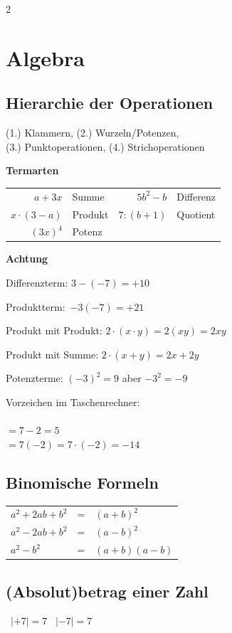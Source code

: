\begin{multicols}{2}
\section*{Algebra}
\subsection*{Hierarchie der Operationen}
(1.) Klammern, (2.) Wurzeln/Potenzen,\\
(3.) Punktoperationen, (4.) Strichoperationen

\textbf{Termarten}

\begin{tabular}{rlrl}
$a+3x$  &Summe  & $5b^2-b$ & Differenz\\
$x\cdot{}(3-a)$&Produkt& $7:(b+1)$& Quotient\\
$(3x)^4$&Potenz &          &
\end{tabular}

\textbf{Achtung}

Differenzterm:  $3-(-7) = +10$

Produktterm:\, $-3(-7) = +21$

Produkt mit Produkt: $2\cdot(x\cdot{}y) = 2(xy) = 2xy$

Produkt mit Summe: $2\cdot(x+y)=2x+2y$

Potenzterme: $(-3)^2 = 9$ aber $-3^2 = -9$


Vorzeichen im Taschenrechner:\\
\vspace{3mm}\\
$=7-2= 5$\\
$=7(-2)=7\cdot{}(-2)= -14$

\subsection*{Binomische Formeln}
\begin{tabular}{lcl}
  $a^2 + 2ab + b^2$  & =  &  $(a+b)^2$\\
  $a^2 - 2ab + b^2$  & =  &  $(a-b)^2$\\
  $a^2 - b^2$        & =  &  $(a+b)(a-b)$
\end{tabular} 


\subsection*{(Absolut)betrag einer Zahl}%
\hfill\, $|+7| = 7$ \hfill\, $|-7| = 7$ \hfill\, %


\end{multicols}
